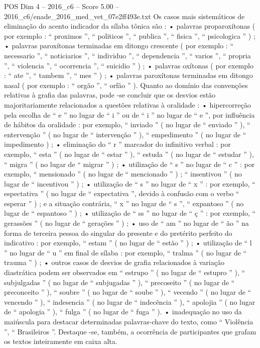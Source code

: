 \begin{textsample}{POS Dim 4 – 2016\_c6 – Score 5.00 – 2016\_c6/enade\_2016\_med\_vet\_07e2ff493e.txt}
Os casos mais sistemáticos de eliminação do acento indicador da sílaba tônica são : • palavras proparoxítonas ( por exemplo : “ proximos ”, “ politicos ”, “ publica ”, “ fisica ”, “ psicologica ” ) ; • palavras paroxítonas terminadas em ditongo crescente ( por exemplo : “ necessario ”, “ noticiarios ”, “ individuo ”, “ dependencia ”, “ varios ”, “ propria ”, “ violencia ”, “ ocorrencia ”, “ suicidio ” ) ; • palavras oxítonas ( por exemplo : “ ate ”, “ tambem ”, “ mes ” ) ; • palavras paroxítonas terminadas em ditongo nasal ( por exemplo : “ orgão ”, “ orfão ” ).
Quanto ao domínio das convenções relativas à grafia das palavras, pode -se concluir que os desvios estão majoritariamente relacionados a questões relativas à oralidade : • hipercorreção pela escolha de “ e ” no lugar de “ i ” ou de “ i ” no lugar de “ e ”, por influência de hábitos da oralidade : por exemplo, “ inviado ” ( no lugar de “ enviado ” ), “ entervenção ” ( no lugar de “ intervenção ” ), “ empedimento ” ( no lugar de “ impedimento ) ; • eliminação do “ r ” marcador do infinitivo verbal : por exemplo, “ esta ” ( no lugar de “ estar ” ), “ estuda ” ( no lugar de “ estudar ” ), “ migra ” ( no lugar de “ migrar ” ) ; • utilização de “ s ” no lugar de “ c ” : por exemplo, “ mensionado ” ( no lugar de “ mencionado ” ) ; “ insentivou ” ( no lugar de “ incentivou ” ) ; • utilização de “ s ” no lugar de “ x ” : por exemplo, “ espectativa ” ( no lugar de “ expectativa ”, devido à confusão com o verbo “ esperar ” ) ; e a situação contrária, “ x ” no lugar de “ s ”, “ expantoso ” ( no lugar de “ espantoso ” ) ; • utilização de “ ss ” no lugar de “ ç ” : por exemplo, “ gerassões ” ( no lugar de “ gerações ” ) ; • uso de “ am ” no lugar de “ ão ” na forma de terceira pessoa do singular do presente e do pretérito perfeito do indicativo : por exemplo, “ estam ” ( no lugar de “ estão ” ) ; • utilização de “ l ” no lugar de “ u ” em final de sílaba : por exemplo, “ tralma ” ( no lugar de “ trauma ” ) ; • outros casos de desvios de grafia relacionados à variação diastrática podem ser observados em “ estrupo ” ( no lugar de “ estupro ” ), “ subjulgadas ” ( no lugar de “ subjugadas ” ), “ precoseito ” ( no lugar de “ preconceito ” ), “ soubre ” ( no lugar de “ soube ” ), “ vecendo ” ( no lugar de “ vencendo ” ), “ indesencia ” ( no lugar de “ indecência ” ), “ apolojia ” ( no lugar de “ apologia ” ), “ fulga ” ( no lugar de “ fuga ” ). • inadequação no uso da maiúscula para destacar determinadas palavras-chave do texto, como “ Violência ”, “ Brasileiros ”.
Destaque -se, também, a ocorrência de participantes que grafam os textos inteiramente em caixa alta.

\end{textsample}
